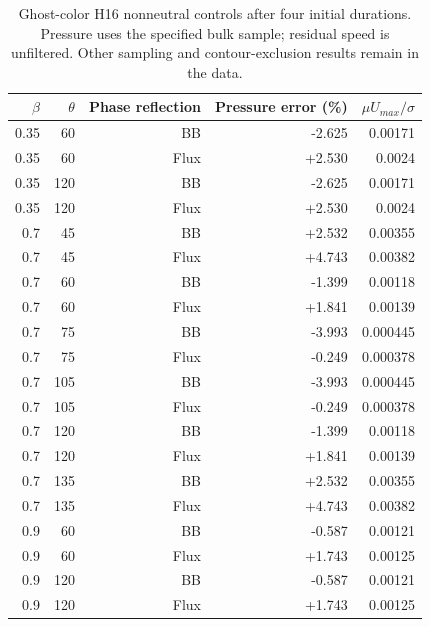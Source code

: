 \begin{table}[htbp]\centering\small
\caption{Ghost-color H16 nonneutral controls after four initial durations. Pressure uses the specified bulk sample; residual speed is unfiltered. Other sampling and contour-exclusion results remain in the data.}
\begin{tabular}{rrrrr}\toprule
$\beta$ & $\theta$ & Phase reflection & Pressure error (\%) & $\mu U_{max}/\sigma$ \\ \midrule
0.35 & 60 & BB & -2.625 & 0.00171 \\
0.35 & 60 & Flux & +2.530 & 0.0024 \\
0.35 & 120 & BB & -2.625 & 0.00171 \\
0.35 & 120 & Flux & +2.530 & 0.0024 \\
0.7 & 45 & BB & +2.532 & 0.00355 \\
0.7 & 45 & Flux & +4.743 & 0.00382 \\
0.7 & 60 & BB & -1.399 & 0.00118 \\
0.7 & 60 & Flux & +1.841 & 0.00139 \\
0.7 & 75 & BB & -3.993 & 0.000445 \\
0.7 & 75 & Flux & -0.249 & 0.000378 \\
0.7 & 105 & BB & -3.993 & 0.000445 \\
0.7 & 105 & Flux & -0.249 & 0.000378 \\
0.7 & 120 & BB & -1.399 & 0.00118 \\
0.7 & 120 & Flux & +1.841 & 0.00139 \\
0.7 & 135 & BB & +2.532 & 0.00355 \\
0.7 & 135 & Flux & +4.743 & 0.00382 \\
0.9 & 60 & BB & -0.587 & 0.00121 \\
0.9 & 60 & Flux & +1.743 & 0.00125 \\
0.9 & 120 & BB & -0.587 & 0.00121 \\
0.9 & 120 & Flux & +1.743 & 0.00125 \\
\bottomrule\end{tabular}\end{table}

